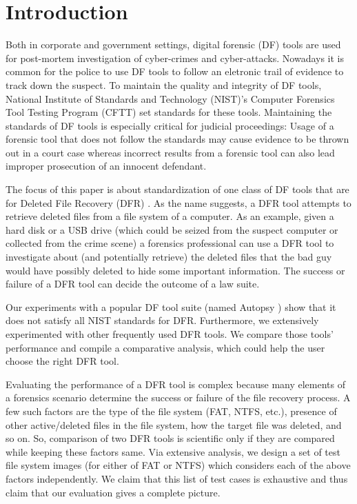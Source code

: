 
\section{Introduction}

Both in corporate and government settings, digital forensic (DF) tools are used for post-mortem investigation of cyber-crimes and cyber-attacks. 
Nowadays it is common \cite{df:news} for the police to use DF tools to follow an eletronic trail of evidence to track down the suspect. 
To maintain the quality and integrity of DF tools, National Institute of Standards and Technology (NIST)'s 
Computer Forensics Tool Testing Program (CFTT) \cite{cftt:nist} 
set standards for these tools. Maintaining the standards of DF tools 
is especially critical for judicial proceedings: Usage of a forensic tool that does not follow the standards may cause evidence to be thrown 
out in a court case whereas incorrect results from a forensic tool can also lead improper prosecution of an innocent defendant. 

The focus of this paper is about standardization of one class of DF 
tools that are for Deleted File Recovery (DFR) \cite{meta:dfr:standards}. 
As the name suggests, a DFR tool attempts to retrieve deleted files
from a file system of a computer. As an example, given a hard disk or a USB drive 
(which could be seized from the suspect computer or collected from the crime scene) a 
forensics professional can use a DFR tool to investigate about (and potentially retrieve) the deleted files that 
the bad guy would have possibly deleted to hide some important information. 
The success or failure of a DFR tool can decide the outcome of a law suite.  

Our experiments with a popular DF tool suite (named Autopsy \cite{autopsy}) 
show that it does not satisfy all NIST standards for DFR. 
Furthermore, we extensively experimented with other frequently used DFR tools. 
We compare those tools' performance and compile a comparative analysis, which could help the user choose the right DFR tool. 

Evaluating the performance of a DFR tool is complex because many elements of a forensics scenario determine 
the success or failure of the file recovery process. 
A few such factors are the type of the file system (FAT, NTFS, etc.), presence of other active/deleted 
files in the file system, how the target file was deleted, and so on.
So, comparison of two DFR tools is scientific only if they are compared while keeping these factors same. 
Via extensive analysis, we design a set of test file system images (for either of FAT or NTFS) which considers each of the above factors independently. 
We claim that this list of test cases is exhaustive and thus claim that our evaluation gives a complete picture. 
 

